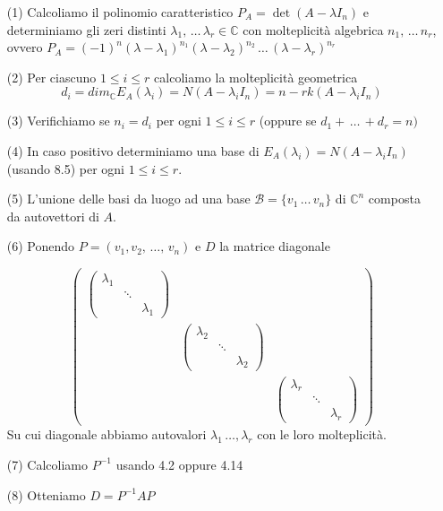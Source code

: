 \documentclass[12pt]{article}
\begin{document}
\begin{enumerate}
    \item[(1)] Calcoliamo il polinomio caratteristico $P_A = \det{(A - \lambda I_n)}$ e determiniamo gli zeri distinti $\lambda_1, \, \dots \, \lambda_r \in \mathbb{C}$ con molteplicità algebrica $n_1, \, \dots \, n_r$, ovvero $P_A = (-1)^n(\lambda - \lambda_1)^{n_1}(\lambda - \lambda_2)^{n_2} \, \dots \, (\lambda - \lambda_r)^{n_r}$
    \item[(2)] Per ciascuno $1 \le i \le r$ calcoliamo la molteplicità geometrica
    \[d_i = dim_{\mathbb{C}}E_A(\lambda_i) = N(A - \lambda_i I_n) = n - rk(A-\lambda_i I_n)\]
    \item[(3)] Verifichiamo se $n_i = d_i$ per ogni $1 \le i \le r$ (oppure se $d_1 + \, \dots \, + d_r = n)$
    \item[(4)] In caso positivo determiniamo una base di $E_A(\lambda_i) = N(A - \lambda_i I_n)$ (usando 8.5) per ogni $1 \le i \le r$.
    \item[(5)] L'unione delle basi da luogo ad una base $\mathcal{B} = \{v_1 \, \dots \, v_n\}$ di $\mathbb{C}^n$ composta da autovettori di $A$.
    \item[(6)] Ponendo $P = (v_1, v_2, \, \dots, \, v_n )$ e $D$ la matrice diagonale

    \[\begin{pmatrix}
        \begin{pmatrix}
            \lambda_1 &  & \\
             & \ddots & \\
             &  & \lambda_1
        \end{pmatrix} & &\\
         & \begin{pmatrix}
            \lambda_2 &  & \\
             & \ddots & \\
             &  & \lambda_2
        \end{pmatrix}& \\
         & & \begin{pmatrix}
            \lambda_r &  & \\
             & \ddots & \\
             &  & \lambda_r
        \end{pmatrix}
    \end{pmatrix}\]
Su cui diagonale abbiamo autovalori $\lambda_1 \, \dots, \lambda_r$ con le loro molteplicità.
    \item[(7)] Calcoliamo $P^{-1}$ usando 4.2 oppure 4.14
    \item[(8)] Otteniamo $D = P^{-1}AP$

\end{enumerate}
\end{document}
